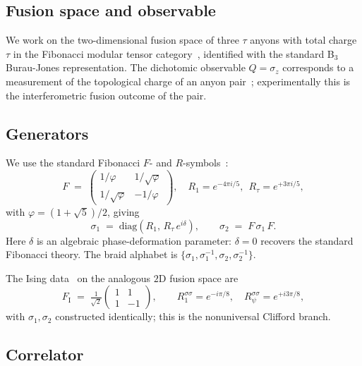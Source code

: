 \documentclass[aps,prx,reprint,amsmath,amssymb,floatfix,nofootinbib,superscriptaddress]{revtex4-2}
\begin{document}
\subsection{Fusion space and observable}

We work on the two-dimensional fusion space of three $\tau$ anyons
with total charge $\tau$ in the Fibonacci modular tensor
category~\cite{NayakSimonStern2008}, identified with the standard
B$_{3}$ Burau-Jones representation. The dichotomic observable
$Q = \sigma_{z}$ corresponds to a measurement of the topological
charge of an anyon pair~\cite{Bonderson2008}; experimentally this is
the interferometric fusion outcome of the pair.

\subsection{Generators}

We use the standard Fibonacci $F$- and $R$-symbols~\cite{NayakSimonStern2008}:
\begin{equation}
  F \;=\;
  \begin{pmatrix} 1/\varphi & 1/\sqrt{\varphi} \\
                  1/\sqrt{\varphi} & -1/\varphi \end{pmatrix},
  \quad
  R_{1} = e^{-4\pi i/5},\ \ R_{\tau} = e^{+3\pi i/5},
\end{equation}
with $\varphi = (1+\sqrt{5})/2$, giving
\begin{equation}
  \sigma_{1} \;=\; \mathrm{diag}(R_{1},\,R_{\tau}\,e^{i\delta}),
  \qquad
  \sigma_{2} \;=\; F\,\sigma_{1}\,F.
\end{equation}
Here $\delta$ is an algebraic phase-deformation parameter: $\delta=0$
recovers the standard Fibonacci theory. The braid alphabet is
$\{\sigma_{1},\sigma_{1}^{-1},\sigma_{2},\sigma_{2}^{-1}\}$.

The Ising data~\cite{NayakSimonStern2008} on the analogous $2$D
fusion space are
\begin{equation}
  F_{\mathrm{I}} \;=\; \tfrac{1}{\sqrt{2}}
  \begin{pmatrix} 1 & 1 \\ 1 & -1 \end{pmatrix},
  \qquad
  R^{\sigma\sigma}_{1} = e^{-i\pi/8},
  \quad
  R^{\sigma\sigma}_{\psi} = e^{+i 3\pi/8},
\end{equation}
with $\sigma_{1},\sigma_{2}$ constructed identically; this is the
nonuniversal Clifford branch.

\subsection{Correlator}
\end{document}
